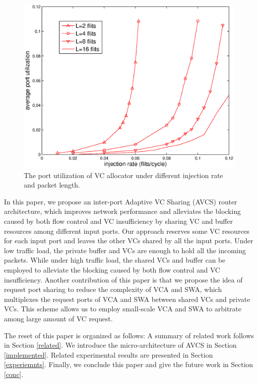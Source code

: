 \documentclass[paper]{ieice}
\begin{document}
\begin{figure}
\centering\includegraphics[scale=0.4]{figures/util.eps}
\caption{The port utilization of VC allocator under different injection rate and packet length.}\label{utilization}
\end{figure}

In this paper, we propose an inter-port Adaptive VC Sharing (AVCS) router architecture, which improves network performance and alleviates the blocking caused by both flow control and VC insufficiency by sharing VC and buffer resources among different input ports. Our approach reserves some VC resources for each input port and leaves the other VCs shared by all the input ports. Under low traffic load, the private buffer and VCs are enough to hold all the incoming packets. While under high traffic load, the shared VCs and buffer can be employed to alleviate the blocking caused by both flow control and VC insufficiency. Another contribution of this paper is that we propose the idea of request port sharing to reduce the complexity of VCA and SWA, which multiplexes the request ports of VCA and SWA between shared VCs and private VCs. This scheme allows us to employ small-scale VCA and SWA to arbitrate among large amount of VC request.

The reset of this paper is organized as follows: A summary of related work follows in Section \ref{related}. We introduce the micro-architecture of AVCS in Section \ref{implemented}. Related experimental results are presented in Section \ref{experiemnts}. Finally, we conclude this paper and give the future work in Section \ref{conc}.
\end{document}
